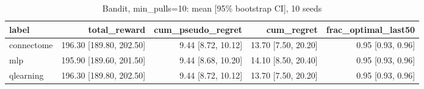 \begin{table}[t]
\centering
\small
\begin{tabular}{lrrrr}
\toprule
label & total\_reward & cum\_pseudo\_regret & cum\_regret & frac\_optimal\_last50 \\
\midrule
connectome & 196.30 [189.80, 202.50] & 9.44 [8.72, 10.12] & 13.70 [7.50, 20.20] & 0.95 [0.93, 0.96] \\
mlp & 195.90 [189.60, 201.50] & 9.44 [8.68, 10.20] & 14.10 [8.50, 20.40] & 0.95 [0.93, 0.96] \\
qlearning & 196.30 [189.80, 202.50] & 9.44 [8.72, 10.12] & 13.70 [7.50, 20.20] & 0.95 [0.93, 0.96] \\
\bottomrule
\end{tabular}
\caption{Bandit, min\_pulls=10: mean [95\% bootstrap CI], 10 seeds}
\label{tab:bandit_headline}
\end{table}